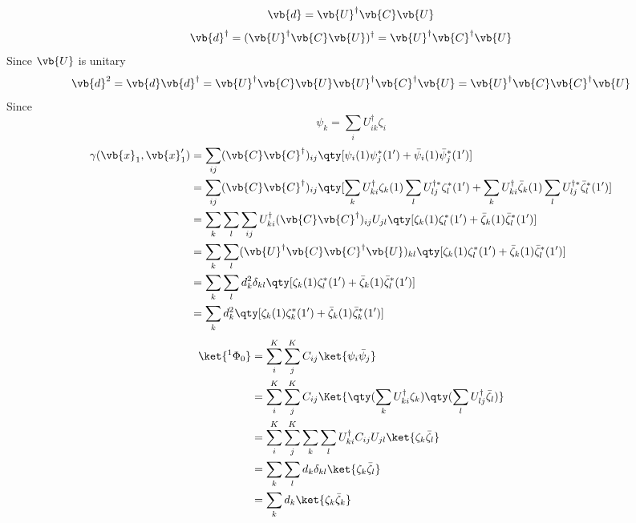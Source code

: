 \documentclass[a4paper]{article}
\begin{document}
\begin{equation}\label{key}
\vb{d} = \vb{U}^\dagger\vb{C}\vb{U} 
\end{equation}
\begin{equation}\label{key}
\vb{d}^\dagger = (\vb{U}^\dagger\vb{C}\vb{U} )^\dagger = \vb{U}^\dagger\vb{C}^\dagger\vb{U} 
\end{equation}
Since $ \vb{U} $ is unitary
\begin{equation}\label{key}
\vb{d}^2 = \vb{d}\vb{d}^\dagger = \vb{U}^\dagger\vb{C}\vb{U} \vb{U}^\dagger\vb{C}^\dagger\vb{U} = \vb{U}^\dagger\vb{C}\vb{C}^\dagger\vb{U}
\end{equation}
Since
\begin{equation}\label{key}
\psi_k = \sum_i U^\dagger_{ik} \zeta_i
\end{equation}
\begin{align}
\gamma(\vb{x}_1,\vb{x}'_1) &= \sum_{ij} (\vb{C}\vb{C}^\dagger)_{ij} \qty[\psi_i(1)\psi_j^*(1') 
+ \bar\psi_i(1)\bar\psi_j^*(1')] \notag\\
&=  \sum_{ij} (\vb{C}\vb{C}^\dagger)_{ij} \qty[\sum_k U^\dagger_{ki}\zeta_k(1)\sum_l U^{\dagger*}_{lj}\zeta_l^*(1')
+ \sum_k U^\dagger_{ki}\bar\zeta_k(1)\sum_l U^{\dagger*}_{lj}\bar\zeta_l^*(1')] \notag\\
&=  \sum_k\sum_l \sum_{ij} U^\dagger_{ki} (\vb{C}\vb{C}^\dagger)_{ij} U_{jl} \qty[\zeta_k(1) \zeta_l^*(1')
+ \bar\zeta_k(1)\bar\zeta_l^*(1')] \notag\\
&=  \sum_k\sum_l (\vb{U}^\dagger \vb{C}\vb{C}^\dagger \vb{U})_{kl} \qty[\zeta_k(1) \zeta_l^*(1')
+ \bar\zeta_k(1)\bar\zeta_l^*(1')] \notag\\
&=  \sum_k\sum_l d^2_k \delta_{kl} \qty[\zeta_k(1) \zeta_l^*(1')
+ \bar\zeta_k(1)\bar\zeta_l^*(1')] \notag\\
&= \sum_k d^2_k \qty[\zeta_k(1) \zeta_k^*(1')
+ \bar\zeta_k(1) \bar\zeta_k^*(1')] 
\end{align}
\begin{align}
\ket{^1\Phi_0} &= \sum_i^K \sum_j^K C_{ij} \ket{\psi_i\bar\psi_j} \notag\\
&= \sum_i^K \sum_j^K C_{ij} \Ket{ \qty(\sum_k U^\dagger_{ki} \zeta_k)\qty(\sum_l U^\dagger_{lj} \bar\zeta_l)} \notag\\
&= \sum_i^K \sum_j^K \sum_k\sum_l U^\dagger_{ki} C_{ij} U_{jl} \ket{ \zeta_k  \bar\zeta_l} \notag\\
&= \sum_k\sum_l d_{k}\delta_{kl} \ket{ \zeta_k  \bar\zeta_l} \notag\\
&= \sum_k d_{k} \ket{ \zeta_k  \bar\zeta_k}
\end{align}
\end{document}
